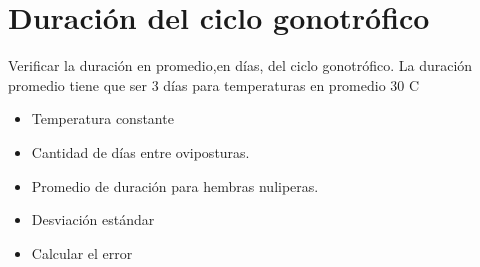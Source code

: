 
\section{Duración del ciclo gonotrófico}
Verificar la duración en promedio,en días, del ciclo gonotrófico. La duración promedio tiene que ser 3
días para temperaturas en promedio 30 C

\begin{itemize}
    \item Temperatura constante 
    \item Cantidad de días entre oviposturas.
    \item Promedio de duración para hembras nuliperas.
    \item Desviación estándar
    \item Calcular el error
\end{itemize}
